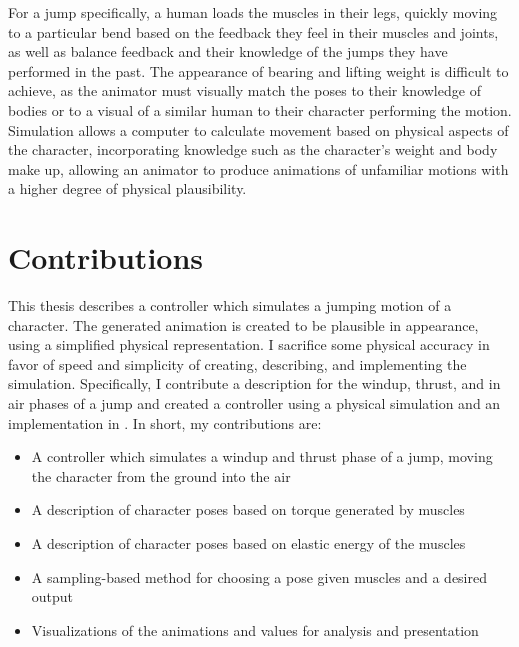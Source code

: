 For a jump specifically, a human loads the muscles in their legs, quickly moving to a particular bend based on the feedback they feel in their muscles and joints, as well as balance feedback and their knowledge of the jumps they have performed in the past.  The appearance of bearing and lifting weight is difficult to achieve, as the animator must visually match the poses to their knowledge of bodies or to a visual of a similar human to their character performing the motion.  Simulation allows a computer to calculate movement based on physical aspects of the character, incorporating knowledge such as the character's weight and body make up, allowing an animator to produce animations of unfamiliar motions with a higher degree of physical plausibility.


\section{Contributions}
\label{section:contributions}
	This thesis describes a controller which simulates a jumping motion of a character.  The generated animation is created to be plausible in appearance, using a simplified physical representation.  I sacrifice some physical accuracy in favor of speed and simplicity of creating, describing, and implementing the simulation.  Specifically, I contribute a description for the windup, thrust, and in air phases of a jump and created a controller using a physical simulation and an implementation in \unity{}.  In short, my contributions are:
	\begin{itemize}
		\item A controller which simulates a windup and thrust phase of a jump, moving the character from the ground into the air
		\item A description of character poses based on torque generated by muscles
		\item A description of character poses based on elastic energy of the muscles
		\item A sampling-based method for choosing a pose given muscles and a desired output
		\item Visualizations of the animations and values for analysis and presentation
	\end{itemize}

